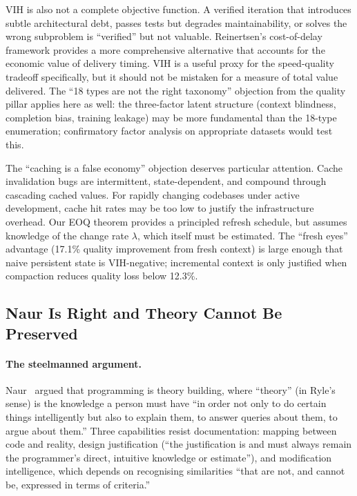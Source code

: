 \documentclass[11pt, a4paper, logo, copyright]{googledeepmind}
\begin{document}
VIH is also not a complete objective function. A verified iteration that introduces subtle architectural debt, passes tests but degrades maintainability, or solves the wrong subproblem is ``verified'' but not valuable. Reinertsen's cost-of-delay framework provides a more comprehensive alternative that accounts for the economic value of delivery timing. VIH is a useful proxy for the speed-quality tradeoff specifically, but it should not be mistaken for a measure of total value delivered. The ``18 types are not the right taxonomy'' objection from the quality pillar applies here as well: the three-factor latent structure (context blindness, completion bias, training leakage) may be more fundamental than the 18-type enumeration; confirmatory factor analysis on appropriate datasets would test this.

The ``caching is a false economy'' objection deserves particular attention. Cache invalidation bugs are intermittent, state-dependent, and compound through cascading cached values. For rapidly changing codebases under active development, cache hit rates may be too low to justify the infrastructure overhead. Our EOQ theorem provides a principled refresh schedule, but assumes knowledge of the change rate $\lambda$, which itself must be estimated. The ``fresh eyes'' advantage (17.1\% quality improvement from fresh context) is large enough that naive persistent state is VIH-negative; incremental context is only justified when compaction reduces quality loss below 12.3\%.


\subsection{Naur Is Right and Theory Cannot Be Preserved}
\label{sec:contrarian-naur}

\paragraph{The steelmanned argument.}
Naur~\citep{naur1985} argued that programming is theory building, where ``theory'' (in Ryle's sense) is the knowledge a person must have ``in order not only to do certain things intelligently but also to explain them, to answer queries about them, to argue about them.'' Three capabilities resist documentation: mapping between code and reality, design justification (``the justification is and must always remain the programmer's direct, intuitive knowledge or estimate''), and modification intelligence, which depends on recognising similarities ``that are not, and cannot be, expressed in terms of criteria.''
\end{document}
